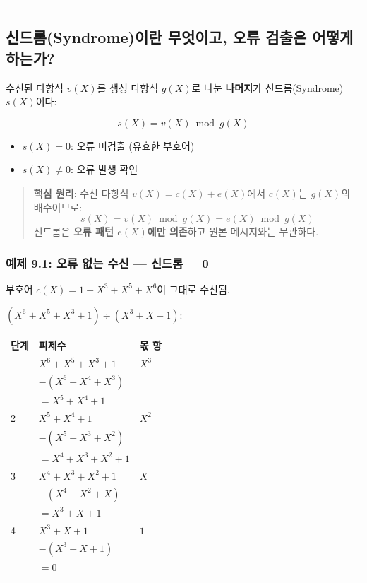 \documentclass[
  oneside]{article}
\providecommand{\tightlist}{%
  \setlength{\itemsep}{0pt}\setlength{\parskip}{0pt}}
\begin{document}
\begin{center}\rule{0.5\linewidth}{0.5pt}\end{center}

\subsection{신드롬(Syndrome)이란 무엇이고, 오류 검출은 어떻게
하는가?}\label{uxc2e0uxb4dcuxb86csyndromeuxc774uxb780-uxbb34uxc5c7uxc774uxace0-uxc624uxb958-uxac80uxcd9cuxc740-uxc5b4uxb5bbuxac8c-uxd558uxb294uxac00}

수신된 다항식 \(v(X)\)를 생성 다항식 \(g(X)\)로 나눈 \textbf{나머지}가
신드롬(Syndrome) \(s(X)\)이다:

\[s(X) = v(X) \bmod g(X)\]

\begin{itemize}
\tightlist
\item
  \(s(X) = 0\): 오류 미검출 (유효한 부호어)
\item
  \(s(X) \neq 0\): 오류 발생 확인
\end{itemize}

\begin{quote}
\textbf{핵심 원리}: 수신 다항식 \(v(X) = c(X) + e(X)\)에서 \(c(X)\)는
\(g(X)\)의 배수이므로: \[s(X) = v(X) \bmod g(X) = e(X) \bmod g(X)\]
신드롬은 \textbf{오류 패턴 \(e(X)\)에만 의존}하고 원본 메시지와는
무관하다.
\end{quote}

\subsubsection{예제 9.1: 오류 없는 수신 --- 신드롬 =
0}\label{uxc608uxc81c-9.1-uxc624uxb958-uxc5c6uxb294-uxc218uxc2e0-uxc2e0uxb4dcuxb86c-0}

부호어 \(c(X) = 1 + X^3 + X^5 + X^6\)이 그대로 수신됨.

\((X^6 + X^5 + X^3 + 1) \div (X^3 + X + 1)\):

\begin{longtable}[]{@{}lll@{}}
\toprule\noalign{}
단계 & 피제수 & 몫 항 \\
\midrule\noalign{}
\endhead
\bottomrule\noalign{}
\endlastfoot
1 & \(X^6 + X^5 + X^3 + 1\) & \(X^3\) \\
& \(-(X^6 + X^4 + X^3)\) & \\
& \(= X^5 + X^4 + 1\) & \\
2 & \(X^5 + X^4 + 1\) & \(X^2\) \\
& \(-(X^5 + X^3 + X^2)\) & \\
& \(= X^4 + X^3 + X^2 + 1\) & \\
3 & \(X^4 + X^3 + X^2 + 1\) & \(X\) \\
& \(-(X^4 + X^2 + X)\) & \\
& \(= X^3 + X + 1\) & \\
4 & \(X^3 + X + 1\) & \(1\) \\
& \(-(X^3 + X + 1)\) & \\
& \(= 0\) & \\
\end{longtable}
\end{document}
